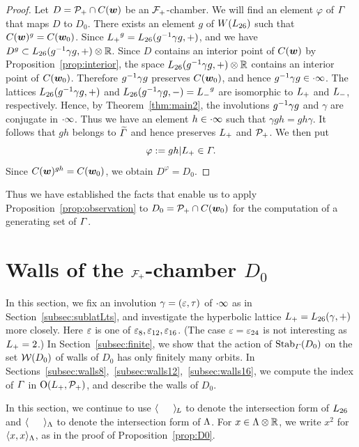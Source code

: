 \documentclass{amsart} %
\begin{document}
\begin{proof}
Let $D=\mathord{\mathcal{P}}_{+} \cap \mathord{C}(\boldsymbol{w})$ be an $\mathord{\mathcal{F}}_{+}$-chamber.
We will find an element $\varphi$ of $\varGamma$ 
that maps $D$ to $D_0$.
There exists an element $g$ of $W(L_{26})$
such that $\mathord{C}(\boldsymbol{w})^g=\mathord{C}(\boldsymbol{w}_0)$.
Since  ${L_{+}}^g=L_{26}(g^{-1} \gamma g, +)$, 
and we have $D^g\subset L_{26}(g^{-1} \gamma g, +)\otimes \mathord{\mathbb{R}}$.
Since $D$ contains an interior point of $\mathord{C}(\boldsymbol{w})$ by 
Proposition~\ref{prop:interior},
the space $L_{26}(g^{-1} \gamma g, +)\otimes \mathord{\mathbb{R}}$ contains an interior point of $\mathord{C}(\boldsymbol{w}_0)$.
Therefore $g^{-1} \gamma g$ preserves $\mathord{C}(\boldsymbol{w}_0)$,
and hence $g^{-1} \gamma g \in \cdot \infty$.
The lattices $L_{26}(g^{-1} \gamma g, + )$ and $L_{26}(g^{-1} \gamma g, -)={L_{-}}^g$
are isomorphic to $L_{+}$ and $L_{-}$, respectively.
Hence, by Theorem~\ref{thm:main2},
the involutions $g^{-1} \gamma g$ and $\gamma$ are conjugate in $\cdot \infty$.
Thus we have an element $h\in \cdot \infty$
such that $\gamma g h =gh\gamma $.
It follows that $gh$ belongs to $\widetilde{\varGamma}$ and hence preserves $L_{+}$ and $\mathord{\mathcal{P}}_{+}$.
We then put
\[
\varphi:=gh|L_{+}\in \varGamma.
\]
Since $\mathord{C}(\boldsymbol{w})^{gh}=\mathord{C}(\boldsymbol{w}_0)$,
we obtain  $D^\varphi=D_0$.
\end{proof}
%
%
Thus we have established the facts that enable us 
to apply Proposition~\ref{prop:observation}
to $D_0=\mathord{\mathcal{P}}_{+}\cap \mathord{C}(\boldsymbol{w}_0)$ 
for the computation of a generating set of
$\varGamma$.
%
%
\section{Walls of the $\mathord{\mathcal{F}}_{+}$-chamber $D_0$}\label{sec:wallsD0}
%
In this section, 
we fix an involution $\gamma=(\varepsilon, \tau)$ of $\cdot \infty$ as in Section~\ref{subsec:sublatLts},
 and   investigate the hyperbolic lattice $L_{+}=L_{26}(\gamma, +)$
 more closely.
 Here $\varepsilon$ is one of $\varepsilon_8, \varepsilon_{12}, \varepsilon_{16}$.
(The case $\varepsilon=\varepsilon_{24}$ is not interesting as $L_{+}=2$.)
In Section~\ref{subsec:finite},
we show that 
the action of $\operatorname{Stab}_{\varGamma}(D_0)$ on the set $\mathord{\mathcal{W}}(D_0)$ of 
walls of $D_0$ has only finitely many orbits.
In Sections~\ref{subsec:walls8},~\ref{subsec:walls12},~\ref{subsec:walls16}, 
we compute the index of $\varGamma$ in
$\mathord{\mathrm{O}}(L_{+}, \mathord{\mathcal{P}}_{+})$,
and describe the walls of $D_0$.
%
\par
In this section,
we continue to use
$\langle \phantom{a, a} \rangle_{\hskip -1pt L}$ to denote the intersection form of $L_{26}$
and $\langle \phantom{a, a} \rangle_{\Lambda}$ to denote the intersection form of $\Lambda$.
For $x\in \Lambda\otimes\mathord{\mathbb{R}}$, we write $x^2$ for $\langle x,x \rangle_{\Lambda}$,
as in the proof of Proposition~\ref{prop:D0}.
%
\end{document}
